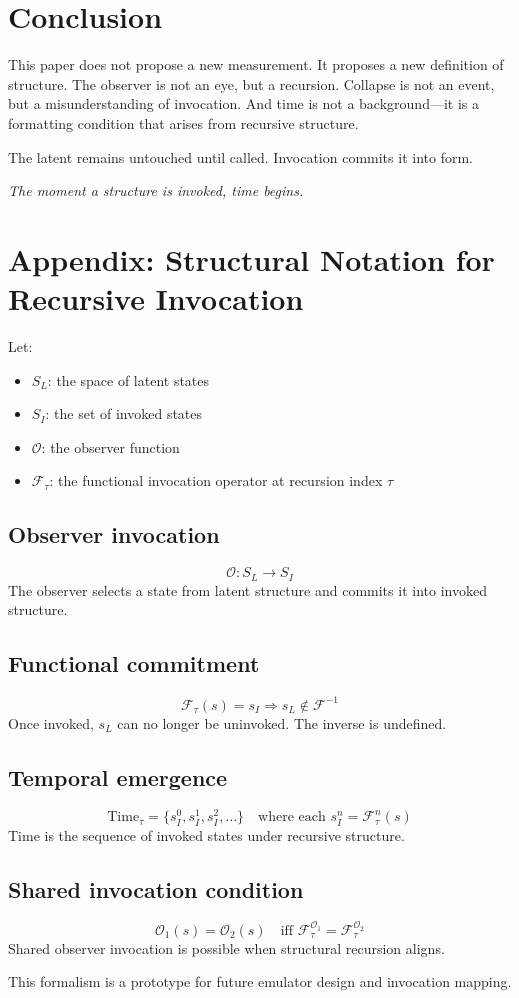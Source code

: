\documentclass[12pt]{article}
\begin{document}
\section{Conclusion}

This paper does not propose a new measurement. It proposes a new definition of structure. The observer is not an eye, but a recursion. Collapse is not an event, but a misunderstanding of invocation. And time is not a background---it is a formatting condition that arises from recursive structure.

The latent remains untouched until called. Invocation commits it into form.

\textit{The moment a structure is invoked, time begins.}

\newpage
\section*{Appendix: Structural Notation for Recursive Invocation}

Let:
\begin{itemize}
    \item \( S_L \): the space of latent states
    \item \( S_I \): the set of invoked states
    \item \( \mathcal{O} \): the observer function
    \item \( \mathcal{F}_\tau \): the functional invocation operator at recursion index \( \tau \)
\end{itemize}

\subsection*{Observer invocation}
\[
\mathcal{O} : S_L \rightarrow S_I
\]
The observer selects a state from latent structure and commits it into invoked structure.

\subsection*{Functional commitment}
\[
\mathcal{F}_\tau(s) = s_I \Rightarrow s_L \notin \mathcal{F}^{-1}
\]
Once invoked, \( s_L \) can no longer be uninvoked. The inverse is undefined.

\subsection*{Temporal emergence}
\[
\text{Time}_\tau = \{s_I^0, s_I^1, s_I^2, \dots\} \quad \text{where each } s_I^n = \mathcal{F}_\tau^n(s)
\]
Time is the sequence of invoked states under recursive structure.

\subsection*{Shared invocation condition}
\[
\mathcal{O}_1(s) = \mathcal{O}_2(s) \quad \text{iff } \mathcal{F}_\tau^{\mathcal{O}_1} = \mathcal{F}_\tau^{\mathcal{O}_2}
\]
Shared observer invocation is possible when structural recursion aligns.

\vspace{1em}
\noindent This formalism is a prototype for future emulator design and invocation mapping.
\end{document}
